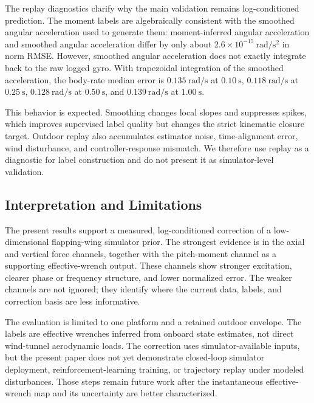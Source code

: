 The replay diagnostics clarify why the main validation remains log-conditioned prediction. The moment labels are algebraically consistent with the smoothed angular acceleration used to generate them: moment-inferred angular acceleration and smoothed angular acceleration differ by only about $2.6\times10^{-15}~\mathrm{rad/s^2}$ in norm RMSE. However, smoothed angular acceleration does not exactly integrate back to the raw logged gyro. With trapezoidal integration of the smoothed acceleration, the body-rate median error is $0.135~\mathrm{rad/s}$ at $0.10~\mathrm{s}$, $0.118~\mathrm{rad/s}$ at $0.25~\mathrm{s}$, $0.128~\mathrm{rad/s}$ at $0.50~\mathrm{s}$, and $0.139~\mathrm{rad/s}$ at $1.00~\mathrm{s}$.

This behavior is expected. Smoothing changes local slopes and suppresses spikes, which improves supervised label quality but changes the strict kinematic closure target. Outdoor replay also accumulates estimator noise, time-alignment error, wind disturbance, and controller-response mismatch. We therefore use replay as a diagnostic for label construction and do not present it as simulator-level validation.

\subsection{Interpretation and Limitations}
\label{subsec:interpretation_limitations}

The present results support a measured, log-conditioned correction of a low-dimensional flapping-wing simulator prior. The strongest evidence is in the axial and vertical force channels, together with the pitch-moment channel as a supporting effective-wrench output. These channels show stronger excitation, clearer phase or frequency structure, and lower normalized error. The weaker channels are not ignored; they identify where the current data, labels, and correction basis are less informative.

The evaluation is limited to one platform and a retained outdoor envelope. The labels are effective wrenches inferred from onboard state estimates, not direct wind-tunnel aerodynamic loads. The correction uses simulator-available inputs, but the present paper does not yet demonstrate closed-loop simulator deployment, reinforcement-learning training, or trajectory replay under modeled disturbances. Those steps remain future work after the instantaneous effective-wrench map and its uncertainty are better characterized.
